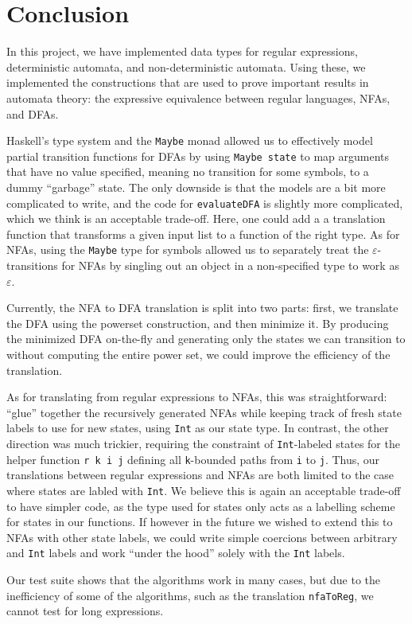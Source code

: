 \section{Conclusion}\label{sec:Conclusion}

In this project, we have implemented data types for regular expressions, deterministic automata, and non-deterministic automata. 
Using these, we implemented the constructions that are used to prove important results in automata theory: 
the expressive equivalence between regular languages, NFAs, and DFAs.

Haskell's type system and the \texttt{Maybe} monad allowed us to effectively model partial transition functions for DFAs by using \texttt{Maybe state} to map arguments that have no value specified, 
meaning no transition for some symbols, to a dummy \enquote{garbage} state. 
The only downside is that the models are a bit more complicated to write, and the code for \texttt{evaluateDFA} is slightly more complicated,
which we think is an acceptable trade-off.
Here, one could add a a translation function that transforms a given input list to a function of the right type. 
As for NFAs, using the \texttt{Maybe} type for symbols allowed us to separately treat the $\varepsilon$-transitions for NFAs 
by singling out an object in a non-specified type to work as $\varepsilon$. 

Currently, the NFA to DFA translation is split into two parts: 
first, we translate the DFA using the powerset construction, and then minimize it. 
By producing the minimized DFA on-the-fly and generating only the states we can transition to without computing the entire power set, 
we could improve the efficiency of the translation.

As for translating from regular expressions to NFAs, this was straightforward: \enquote{glue} together the recursively generated NFAs
while keeping track of fresh state labels to use for new states, using \texttt{Int} as our state type.
In contrast, the other direction was much trickier, requiring the constraint of \texttt{Int}-labeled states for the helper function \texttt{r k i j} 
defining all \texttt{k}-bounded paths from \texttt{i} to \texttt{j}. 
Thus, our translations between regular expressions and NFAs are both limited to the case where states are labled with \texttt{Int}.
We believe this is again an acceptable trade-off to have simpler code, as the type used for states only acts as a labelling scheme for states in our functions.
If however in the future we wished to extend this to NFAs with other state labels,
we could write simple coercions between arbitrary and \texttt{Int} labels and work \enquote{under the hood} solely with the \texttt{Int} labels.

Our test suite shows that the algorithms work in many cases, 
but due to the inefficiency of some of the algorithms, such as the translation \texttt{nfaToReg}, 
we cannot test for long expressions. 




